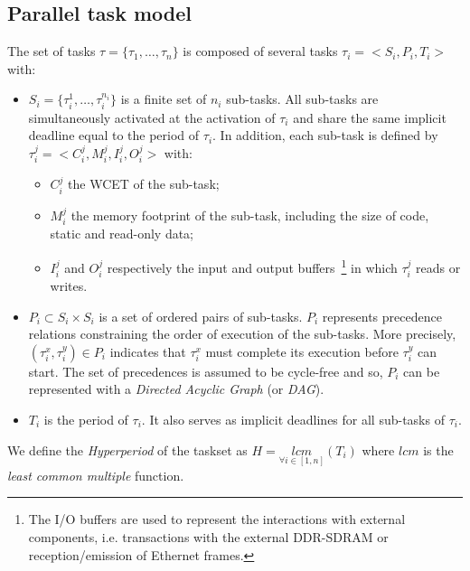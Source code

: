 \documentclass[main.tex]{subfiles}
\begin{document}
\subsection{Parallel task model}
The set of tasks $\tau = \{ \tau_1 , \ldots , \tau_n \}$ is composed of several tasks $\tau_i = < S_i , P_i , T_i >$ with:
\begin{itemize}
    \item $S_i = \{ \tau_i^1 , \ldots , \tau_i^{n_i} \}$ is a finite set of $n_i$ sub-tasks. All sub-tasks are simultaneously activated at the activation of $\tau_i$ and share the same implicit deadline equal to the period of $\tau_i$. In addition, each sub-task is defined by $\tau_i^j = < C_i^j , M_i^j , I_i^j , O_i^j >$ with:
        \begin{itemize}
            \item $C_i^j$ the WCET of the sub-task;
            \item $M_i^j$ the memory footprint of the sub-task, including the size of code, static and read-only data;
            \item $I_i^j$ and $O_i^j$ respectively the input and output buffers~\footnote{The I/O buffers are used to represent the interactions with external components, i.e. transactions with the external DDR-SDRAM or reception/emission of Ethernet frames.} in which $\tau_i^j$ reads or writes.
        \end{itemize}

    \item $P_i \subset S_i \times S_i$ is a set of ordered pairs of sub-tasks. $P_i$ represents precedence relations constraining the order of execution of the sub-tasks. More precisely, $(\tau_i^x , \tau_i^y) \in P_i$ indicates that $\tau_i^x$ must complete its execution before $\tau_i^y$ can start. The set of precedences is assumed to be cycle-free and so, $P_i$ can be represented with a \emph{Directed Acyclic Graph} (or \emph{DAG}).

    \item $T_i$ is the period of $\tau_i$. It also serves as implicit deadlines for all sub-tasks of $\tau_i$.
\end{itemize}

We define the \emph{Hyperperiod} of the taskset as $H = \underset{\forall i \in [1 , n]}{lcm} ( T_i )$ where $lcm$ is the \emph{least common multiple} function.
\end{document}

